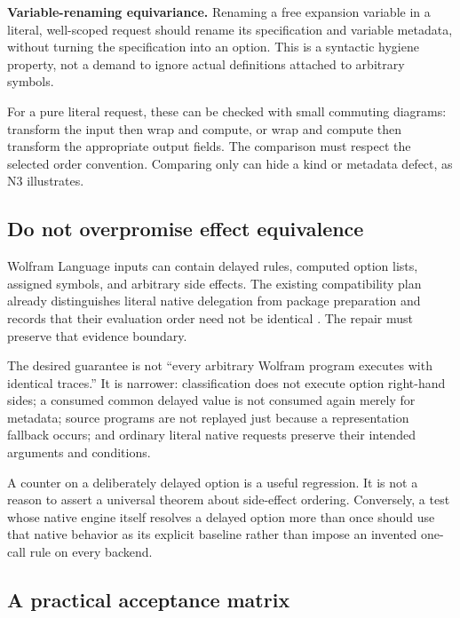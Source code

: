 \documentclass[11pt,a4paper]{article}
\newcommand{\code}[1]{\texttt{\detokenize{#1}}}
\begin{document}
\textbf{Variable-renaming equivariance.} Renaming a free expansion variable in a literal, well-scoped request should rename its specification and variable metadata, without turning the specification into an option. This is a syntactic hygiene property, not a demand to ignore actual definitions attached to arbitrary symbols.

For a pure literal request, these can be checked with small commuting diagrams: transform the input then wrap and compute, or wrap and compute then transform the appropriate output fields. The comparison must respect the selected order convention. Comparing only \code{Normal} can hide a kind or metadata defect, as N3 illustrates.

\subsection{Do not overpromise effect equivalence}

Wolfram Language inputs can contain delayed rules, computed option lists, assigned symbols, and arbitrary side effects. The existing compatibility plan already distinguishes literal native delegation from package preparation and records that their evaluation order need not be identical \cite{nativeplan}. The repair must preserve that evidence boundary.

The desired guarantee is not ``every arbitrary Wolfram program executes with identical traces.'' It is narrower: classification does not execute option right-hand sides; a consumed common delayed value is not consumed again merely for metadata; source programs are not replayed just because a representation fallback occurs; and ordinary literal native requests preserve their intended arguments and conditions.

A counter on a deliberately delayed option is a useful regression. It is not a reason to assert a universal theorem about side-effect ordering. Conversely, a test whose native engine itself resolves a delayed option more than once should use that native behavior as its explicit baseline rather than impose an invented one-call rule on every backend.

\subsection{A practical acceptance matrix}
\end{document}
